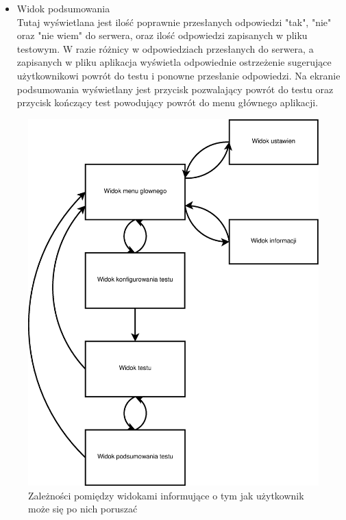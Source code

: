 \documentclass{report}
\begin{document}
\begin{itemize}
				\item Widok podsumowania\\
				Tutaj wyświetlana jest ilość poprawnie przesłanych odpowiedzi "tak", "nie" oraz "nie wiem" do serwera, oraz ilość odpowiedzi zapisanych w pliku testowym. W razie różnicy w odpowiedziach przesłanych do serwera, a zapisanych w pliku aplikacja wyświetla odpowiednie ostrzeżenie sugerujące użytkownikowi powrót do testu i ponowne przesłanie odpowiedzi. Na ekranie podsumowania wyświetlany jest przycisk pozwalający powrót do testu oraz przycisk kończący test powodujący powrót do menu głównego aplikacji.
				
			\end{itemize}
		
			\begin{center}
				\begin{figure}[ht]
					\centering
					\includegraphics[scale=0.40]{diagram_zaleznosci_miedzy_widokami.eps}
					\caption{Zależności pomiędzy widokami informujące o tym jak użytkownik może się po nich poruszać}
				\end{figure}
			\end{center}
		
\end{document}
